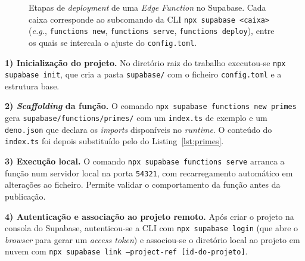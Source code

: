 \documentclass[conference]{IEEEtran}
\begin{document}
\begin{figure}[!htbp]
\centering
{}
\caption{Etapas de \textit{deployment} de uma \textit{Edge Function} no Supabase. Cada caixa corresponde ao subcomando da CLI \texttt{npx supabase <caixa>} (\textit{e.g.}, \texttt{functions new}, \texttt{functions serve}, \texttt{functions deploy}), entre os quais se intercala o ajuste do \texttt{config.toml}.}
\label{fig:deploy}
\end{figure}

\textbf{1) Inicialização do projeto.} No diretório raiz do trabalho executou-se \texttt{npx supabase init}, que cria a pasta \texttt{supabase/} com o ficheiro \texttt{config.toml} e a estrutura base.

\textbf{2) \textit{Scaffolding} da função.} O comando \texttt{npx supabase functions new primes} gera \texttt{supabase/functions/primes/} com um \texttt{index.ts} de exemplo e um \texttt{deno.json} que declara os \textit{imports} disponíveis no \textit{runtime}. O conteúdo do \texttt{index.ts} foi depois substituído pelo do Listing~\ref{lst:primes}.

\textbf{3) Execução local.} O comando \texttt{npx supabase functions serve} arranca a função num servidor local na porta \texttt{54321}, com recarregamento automático em alterações ao ficheiro. Permite validar o comportamento da função antes da publicação.

\textbf{4) Autenticação e associação ao projeto remoto.} Após criar o projeto na consola do Supabase, autenticou-se a CLI com \texttt{npx supabase login} (que abre o \textit{browser} para gerar um \textit{access token}) e associou-se o diretório local ao projeto em nuvem com \texttt{npx supabase link --project-ref [id-do-projeto]}.
\end{document}

